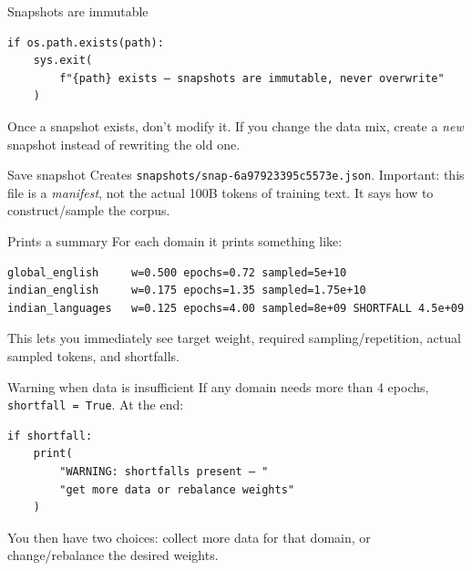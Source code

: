 \begin{paragraphblock}{Snapshots are immutable}
\begin{lstlisting}[style=shadedpython,breaklines=true]
if os.path.exists(path):
    sys.exit(
        f"{path} exists — snapshots are immutable, never overwrite"
    )
\end{lstlisting}
  Once a snapshot exists, don't modify it. If you change the data mix, create
  a \emph{new} snapshot instead of rewriting the old one.
\end{paragraphblock}

\begin{paragraphblock}{Save snapshot}
  Creates \texttt{snapshots/snap-6a97923395c5573e.json}. Important: this file
  is a \emph{manifest}, not the actual 100B tokens of training text. It says
  how to construct/sample the corpus.
\end{paragraphblock}

\begin{paragraphblock}{Prints a summary}
  For each domain it prints something like:
\begin{lstlisting}[style=shadedpython,language={},basicstyle=\scriptsize\ttfamily]
global_english     w=0.500 epochs=0.72 sampled=5e+10
indian_english     w=0.175 epochs=1.35 sampled=1.75e+10
indian_languages   w=0.125 epochs=4.00 sampled=8e+09 SHORTFALL 4.5e+09
\end{lstlisting}
  This lets you immediately see target weight, required sampling/repetition,
  actual sampled tokens, and shortfalls.
\end{paragraphblock}

\begin{paragraphblock}{Warning when data is insufficient}
  If any domain needs more than 4 epochs, \texttt{shortfall = True}. At the
  end:
\begin{lstlisting}[style=shadedpython,breaklines=true]
if shortfall:
    print(
        "WARNING: shortfalls present — "
        "get more data or rebalance weights"
    )
\end{lstlisting}
  You then have two choices: collect more data for that domain, or
  change/rebalance the desired weights.
\end{paragraphblock}

